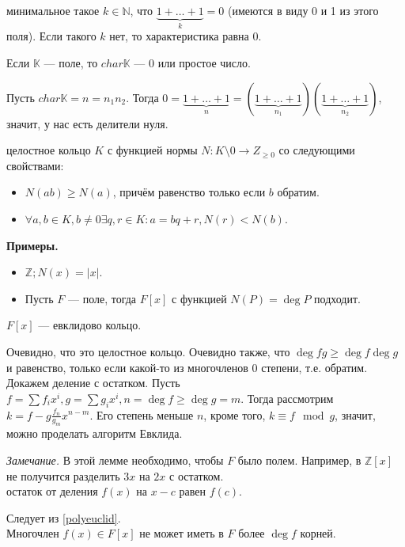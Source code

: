 \documentclass[12pt,a4paper]{article}
\begin{document}
 минимальное такое $k\in \mathbb N$, что $\underbrace{1+\ldots +1}_k=0$ (имеются в виду 0 и 1 из этого поля). Если такого $k$ нет, то характеристика равна 0.

\lemma Если $\mathbb K$ --- поле, то $char\mathbb K$ --- 0 или простое число.

\proof Пусть $char\mathbb K=n=n_1n_2$. Тогда $0=\underbrace{1+\ldots +1}_n=(\underbrace{1+\ldots +1}_{n_1})(\underbrace{1+\ldots +1}_{n_2})$, значит, у нас есть делители нуля.\QEDA\\

\newpage

 целостное кольцо $K$ с функцией нормы $N:K\setminus 0\to Z_{\geq 0}$ со следующими свойствами:

\begin{itemize}
	\item $N(ab)\geq N(a)$, причём равенство только если $b$ обратим.
	\item $\forall a,b\in K,b\neq 0\exists q,r\in K:a=bq+r,N(r)<N(b)$.
\end{itemize}

\textbf{Примеры.}

\begin{itemize}
	\item $\mathbb Z;N(x)=|x|$.
	\item Пусть $F$ --- поле, тогда $F[x]$ с функцией $N(P)=\deg P$ подходит.
\end{itemize}

\lemma $F[x]$ --- евклидово кольцо.\label{polyeuclid}

\proof Очевидно, что это целостное кольцо. Очевидно также, что $\deg fg\geq \deg f\deg g$ и равенство, только если какой-то из многочленов 0 степени, т.е. обратим. Докажем деление с остатком. Пусть $f=\sum f_ix^i,g=\sum g_ix^i,n=\deg f\geq \deg g=m$. Тогда рассмотрим $k=f-g\frac{f_n}{g_m}x^{n-m}$. Его степень меньше $n$, кроме того, $k\equiv f\mod g$, значит, можно проделать алгоритм Евклида. \QEDA

\textit{Замечание.} В этой лемме необходимо, чтобы $F$ было полем. Например, в $\mathbb Z[x]$ не получится разделить $3x$ на $2x$ с остатком.\\

 остаток от деления $f(x)$ на $x-c$ равен $f(c)$.

\proof Следует из \ref{polyeuclid}.\QEDA\\

\theorem Многочлен $f(x)\in F[x]$ не может иметь в $F$ более $\deg f$ корней.
\end{document}
